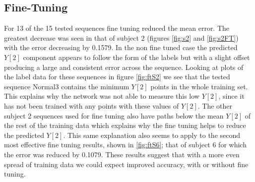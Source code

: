 \documentclass[11pt]{article} %
\begin{document}
\subsection{Fine-Tuning}
\label{sec:finetuning}
For 13 of the 15 tested sequences fine tuning reduced the mean error. The greatest decrease was seen in that of subject 2 (figures \ref{fig:s2} and \ref{fig:s2FT}) with the error decreasing by 0.1579. In the non fine tuned case the predicted $Y[2]$ component appears to follow the form of the labels but with a slight offset producing a large and consistent error across the sequence. Looking at plots of the label data for these sequences in figure \ref{fig:ftS2} we see that the tested sequence Normal3 contains the minimum $Y[2]$ points in the whole training set. This explains why the network was not able to measure this low $Y[2]$, since it has not been trained with any points with these values of $Y[2]$. The other subject 2 sequences used for fine tuning also have paths below the mean $Y[2]$ of the rest of the training data which explains why the fine tuning helps to reduce the predicted $Y[2]$. This same explanation also seems to apply to the second most effective fine tuning results, shown in \ref{fig:ftS6}; that of subject 6 for which the error was reduced by 0.1079. These results suggest that with a more even spread of training data we could expect improved accuracy, with or without fine tuning.
\end{document}
